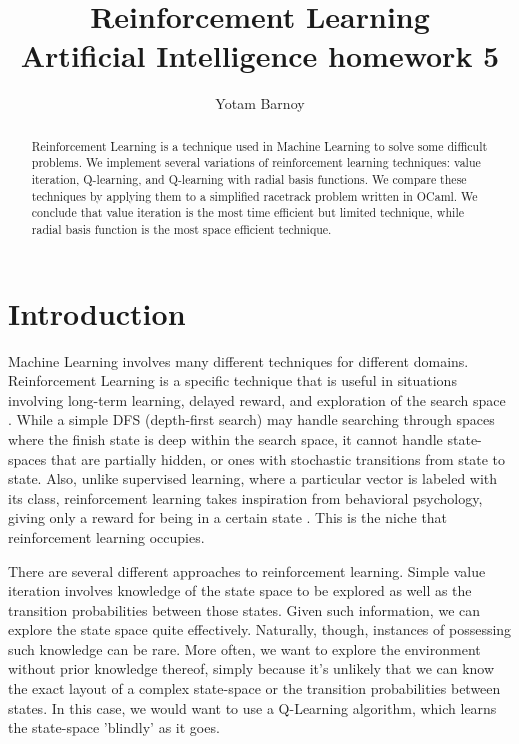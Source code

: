 \documentclass[12pt, letterpaper]{article}
\title{Reinforcement Learning\\ Artificial Intelligence homework 5}
\author{Yotam Barnoy}
\begin{document}
\maketitle

\begin{abstract}
Reinforcement Learning is a technique used in Machine Learning to solve some difficult problems. We implement several variations of reinforcement learning techniques: value iteration, Q-learning, and Q-learning with radial basis functions. We compare these techniques by applying them to a simplified racetrack problem written in OCaml. We conclude that value iteration is the most time efficient but limited technique, while radial basis function is the most space efficient technique.

\end{abstract}

\section{Introduction}
Machine Learning involves many different techniques for different domains. Reinforcement Learning is a specific technique that is useful in situations involving long-term learning, delayed reward, and exploration of the search space \cite{tomMitchellML}. While a simple DFS (depth-first search) may handle searching through spaces where the finish state is deep within the search space, it cannot handle state-spaces that are partially hidden, or ones with stochastic transitions from state to state. Also, unlike supervised learning, where a particular vector is labeled with its class, reinforcement learning takes inspiration from behavioral psychology, giving only a reward for being in a certain state \cite{reinforcementWikipedia}.  This is the niche that reinforcement learning occupies.

There are several different approaches to reinforcement learning. Simple value iteration involves knowledge of the state space to be explored as well as the transition probabilities between those states\cite{russell10artificial}. Given such information, we can explore the state space quite effectively. Naturally, though, instances of possessing such knowledge can be rare. More often, we want to explore the environment without prior knowledge thereof, simply because it's unlikely that we can know the exact layout of a complex state-space or the transition probabilities between states. In this case, we would want to use a Q-Learning algorithm, which learns the state-space 'blindly' as it goes. 
\end{document}
